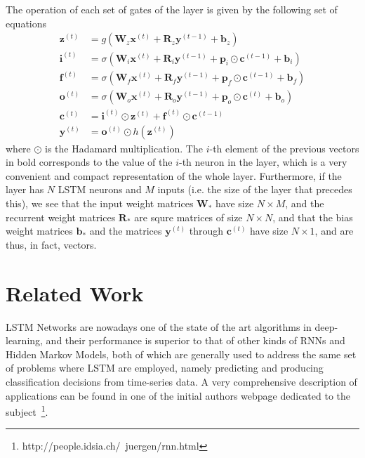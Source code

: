 \documentclass{IEEEtran}
\newcommand{\mb}[1]{\mathbf{#1}}
\begin{document}
The operation of each set of gates of the layer is given by the following set of equations
\begin{eqnarray}
    \mb{z}^{(t)} & = g(\mb{W}_z \mb{x}^{(t)} + \mb{R}_z \mb{y}^{(t-1)} + \mb{b}_z) \nonumber\\
    \mb{i}^{(t)} & = \sigma(\mb{W}_i \mb{x}^{(t)} + \mb{R}_i \mb{y}^{(t-1)} + \mb{p}_i \odot \mb{c}^{(t-1)} + \mb{b}_i) \nonumber\\
    \mb{f}^{(t)} & = \sigma(\mb{W}_f \mb{x}^{(t)} + \mb{R}_f \mb{y}^{(t-1)} + \mb{p}_f \odot \mb{c}^{(t-1)} + \mb{b}_f) \nonumber\\
    \mb{o}^{(t)} & = \sigma(\mb{W}_o \mb{x}^{(t)} + \mb{R}_o \mb{y}^{(t-1)} + \mb{p}_o \odot \mb{c}^{(t)} + \mb{b}_o) \nonumber\\
    \mb{c}^{(t)} & = \mb{i}^{(t)} \odot \mb{z}^{(t)} + \mb{f}^{(t)} \odot \mb{c}^{(t-1)} \nonumber \\
    \mb{y}^{(t)} & = \mb{o}^{(t)} \odot h(\mb{z}^{(t)}) \label{eq:equationsLSTM}
\end{eqnarray}
where $\odot$ is the Hadamard multiplication. The $i$-th element of the previous vectors in bold corresponds 
to the value of the $i$-th neuron in the layer, which is a very convenient and compact representation of the 
whole layer. Furthermore, if the layer has $N$ LSTM neurons and $M$ inputs (i.e. the size of the layer that 
precedes this), we see that the input weight matrices $\mb{W}_*$ have size $N \times M$, and the  recurrent 
weight matrices $\mb{R}_*$ are squre matrices of size $N \times N$, and that the bias weight matrices $\mb{b}_*$ 
and the matrices $\mb{y}^{(t)}$ through $\mb{c}^{(t)}$ have size $N \times 1$, and are thus, in fact, vectors.

\section{Related Work}\label{sec:relwork}
LSTM Networks are nowadays one of the state of the art algorithms in deep-learning, and their performance is
superior to that of other kinds of RNNs and Hidden Markov Models, both of which are generally used to address 
the same set of problems where LSTM are employed, namely predicting and producing classification decisions 
from time-series data. A very comprehensive description of applications can be found in one of the initial 
authors webpage dedicated to the subject~\footnote{http://people.idsia.ch/~juergen/rnn.html}.
\end{document}
